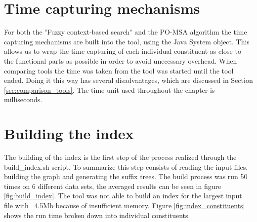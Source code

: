 \documentclass[thesis.tex]{subfiles}
\begin{document}
\section{Time capturing mechanisms}
For both the "Fuzzy context-based search" and the PO-MSA algorithm the time capturing mechanisms are built into the tool, using the Java System object. This allows us to wrap the time capturing of each individual constituent as close to the functional parts as possible in order to avoid unecessary overhead. When comparing tools the time was taken from the tool was started until the tool ended. Doing it this way has several disadvantages, which are discussed in Section \ref{sec:comparison_tools}. The time unit used throughout the chapter is milliseconds.
\section{Building the index}
The building of the index is the first step of the process realized through the build\_index.sh script. To summarize this step consists of reading the input files, building the graph and generating the suffix trees. The build process was run 50 times on 6 different data sets, the averaged results can be seen in figure \ref{fig:build_index}. The tool was not able to build an index for the largest input file with ~4.5Mb because of insufficient memory. Figure \ref{fig:index_constituents} shows the run time broken down into individual constituents.\\
\end{document}
